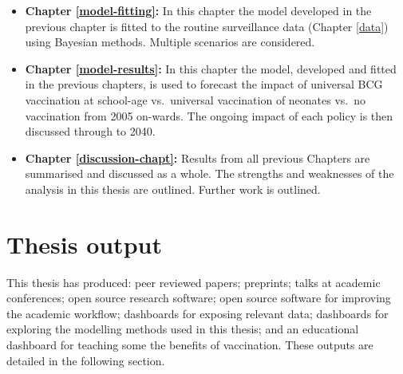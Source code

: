 \documentclass[11pt,twoside]{bristolthesis}
\begin{document}
\begin{itemize}
  \item
    \textbf{Chapter \ref{model-fitting}:} In this chapter the model developed in the previous chapter is fitted to the routine surveillance data (Chapter \ref{data}) using Bayesian methods. Multiple scenarios are considered.
  \item
    \textbf{Chapter \ref{model-results}:} In this chapter the model, developed and fitted in the previous chapters, is used to forecast the impact of universal BCG vaccination at school-age vs.~universal vaccination of neonates vs.~no vaccination from 2005 on-wards. The ongoing impact of each policy is then discussed through to 2040.
  \item
    \textbf{Chapter \ref{discussion-chapt}:} Results from all previous Chapters are summarised and discussed as a whole. The strengths and weaknesses of the analysis in this thesis are outlined. Further work is outlined.
  \end{itemize}
  \hypertarget{thesis-output}{%
  \section{Thesis output}\label{thesis-output}}
  
  This thesis has produced: peer reviewed papers; preprints; talks at academic conferences; open source research software; open source software for improving the academic workflow; dashboards for exposing relevant data; dashboards for exploring the modelling methods used in this thesis; and an educational dashboard for teaching some the benefits of vaccination. These outputs are detailed in the following section.
  
\end{document}
